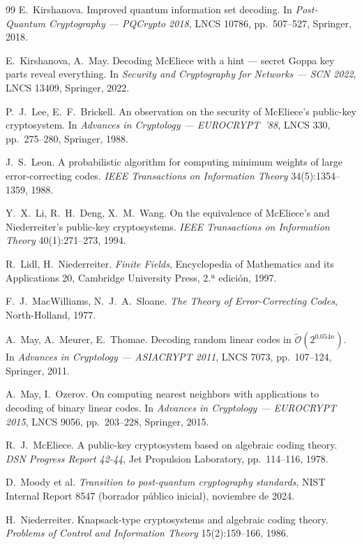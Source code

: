 \documentclass[11pt,a4paper,oneside]{report}
\begin{document}
\begin{thebibliography}{99}
E.~Kirshanova. Improved quantum information set decoding. In
\emph{Post-Quantum Cryptography --- PQCrypto 2018}, LNCS 10786,
pp.~507--527, Springer, 2018.

E.~Kirshanova, A.~May. Decoding McEliece with a hint --- secret
Goppa key parts reveal everything. In \emph{Security and Cryptography
for Networks --- SCN 2022}, LNCS 13409, Springer, 2022.

P.~J.~Lee, E.~F.~Brickell. An observation on the security of
McEliece's public-key cryptosystem. In \emph{Advances in Cryptology
--- EUROCRYPT~'88}, LNCS 330, pp.~275--280, Springer, 1988.

J.~S.~Leon. A probabilistic algorithm for computing minimum weights
of large error-correcting codes. \emph{IEEE Transactions on
Information Theory} 34(5):1354--1359, 1988.

Y.~X.~Li, R.~H.~Deng, X.~M.~Wang. On the equivalence of McEliece's
and Niederreiter's public-key cryptosystems. \emph{IEEE Transactions
on Information Theory} 40(1):271--273, 1994.

R.~Lidl, H.~Niederreiter. \emph{Finite Fields}, Encyclopedia of
Mathematics and its Applications 20, Cambridge University Press,
2.ª edici\'on, 1997.

F.~J.~MacWilliams, N.~J.~A.~Sloane. \emph{The Theory of
Error-Correcting Codes}, North-Holland, 1977.

A.~May, A.~Meurer, E.~Thomae. Decoding random linear codes in
$\tilde{\mathcal{O}}(2^{0.054n})$. In \emph{Advances in Cryptology ---
ASIACRYPT 2011}, LNCS 7073, pp.~107--124, Springer, 2011.

A.~May, I.~Ozerov. On computing nearest neighbors with applications
to decoding of binary linear codes. In \emph{Advances in Cryptology
--- EUROCRYPT 2015}, LNCS 9056, pp.~203--228, Springer, 2015.

R.~J.~McEliece. A public-key cryptosystem based on algebraic coding
theory. \emph{DSN Progress Report 42-44}, Jet Propulsion Laboratory,
pp.~114--116, 1978.

D.~Moody et al. \emph{Transition to post-quantum cryptography
standards}, NIST Internal Report 8547 (borrador p\'ublico inicial),
noviembre de 2024.

H.~Niederreiter. Knapsack-type cryptosystems and algebraic coding
theory. \emph{Problems of Control and Information Theory}
15(2):159--166, 1986.


\end{thebibliography}
\end{document}

